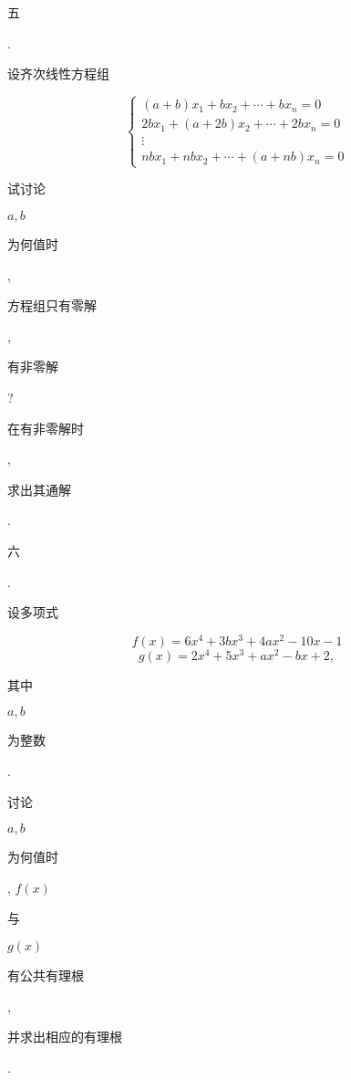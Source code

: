 \documentclass[10pt]{article}
\begin{document}
\begin{CJK}{UTF8}{mj}五\end{CJK}. \begin{CJK}{UTF8}{mj}设齐次线性方程组\end{CJK}
$$
\left\{\begin{array}{l}
(a+b) x_{1}+b x_{2}+\cdots+b x_{n}=0 \\
2 b x_{1}+(a+2 b) x_{2}+\cdots+2 b x_{n}=0 \\
\vdots \\
n b x_{1}+n b x_{2}+\cdots+(a+n b) x_{n}=0
\end{array}\right.
$$
\begin{CJK}{UTF8}{mj}试讨论\end{CJK} $a, b$ \begin{CJK}{UTF8}{mj}为何值时\end{CJK}, \begin{CJK}{UTF8}{mj}方程组只有零解\end{CJK}, \begin{CJK}{UTF8}{mj}有非零解\end{CJK}? \begin{CJK}{UTF8}{mj}在有非零解时\end{CJK}, \begin{CJK}{UTF8}{mj}求出其通解\end{CJK}.

\begin{CJK}{UTF8}{mj}六\end{CJK}. \begin{CJK}{UTF8}{mj}设多项式\end{CJK}
$$
f(x)=6 x^{4}+3 b x^{3}+4 a x^{2}-10 x-1
$$
$$
g(x)=2 x^{4}+5 x^{3}+a x^{2}-b x+2,
$$
\begin{CJK}{UTF8}{mj}其中\end{CJK} $a, b$ \begin{CJK}{UTF8}{mj}为整数\end{CJK}. \begin{CJK}{UTF8}{mj}讨论\end{CJK} $a, b$ \begin{CJK}{UTF8}{mj}为何值时\end{CJK}, $f(x)$ \begin{CJK}{UTF8}{mj}与\end{CJK} $g(x)$ \begin{CJK}{UTF8}{mj}有公共有理根\end{CJK}, \begin{CJK}{UTF8}{mj}并求出相应的有理根\end{CJK}.
\end{document}

